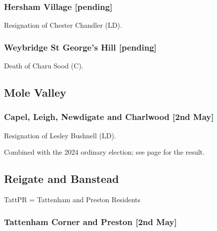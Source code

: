 \documentclass[a4paper,openany]{book}
\begin{document}
\begin{resultsiii}
\subsubsection*{Hersham Village \hspace*{\fill}\nolinebreak[1]%
	\enspace\hspace*{\fill}
	[pending]}


Resignation of Chester Chandler (LD).

\subsubsection*{Weybridge St George's Hill \hspace*{\fill}\nolinebreak[1]%
	\enspace\hspace*{\fill}
	[pending]}


Death of Charu Sood (C).

\subsection*{Mole Valley}

\subsubsection*{Capel, Leigh, Newdigate and Charlwood \hspace*{\fill}\nolinebreak[1]%
	\enspace\hspace*{\fill}
	[2nd May]}


Resignation of Lesley Bushnell (LD).

Combined with the 2024 ordinary election; see page \pageref{MoleValleyCapelLeighNewdigateCharlwood} for the result.

\subsection*{Reigate and Banstead}

TattPR = Tattenham and Preston Residents

\subsubsection*{Tattenham Corner and Preston \hspace*{\fill}\nolinebreak[1]%
	\enspace\hspace*{\fill}
	[2nd May]}


\end{resultsiii}
\end{document}
